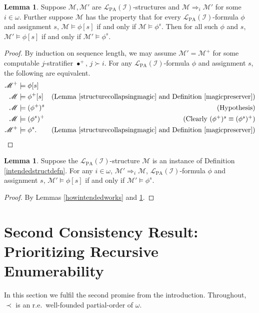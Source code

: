 \documentclass[reqno]{article}
\theoremstyle{definition}
\newtheorem{lemma}[theorem]{Lemma}
\def\L{\mathscr{L}}
\def\M{\mathscr{M}}
\def\LPA{\L_{\mathrm{PA}}}
\def\indset{\mathcal I}
\def\myequiv{\Rightarrow}
\begin{document}
\begin{lemma}
\label{preservedintent}
Suppose $\M,\M'$ are $\LPA(\indset)$-structures
and $\M\myequiv_i\M'$ for some $i\in\omega$.
Further suppose $\M$ has the property that
for every $\LPA(\indset)$-formula $\phi$ and assignment $s$,
$\M\models\phi[s]$ if and only if $\M\models\phi^s$.
Then for all such $\phi$ and $s$,
$\M'\models\phi[s]$ if and only if $\M'\models\phi^s$.
\end{lemma}

\begin{proof}
By induction on sequence length,
we may assume $\M'=\M^+$ for some computable $j$-stratifier $\bullet^+$,
$j\succ i$.
For any $\LPA(\indset)$-formula $\phi$ and assignment $s$,
the following are equivalent.
\begin{align*}
\M^+ &\models \phi[s]\\
\M &\models \phi^+[s]
  &\mbox{(Lemma \ref{structurecollapsingmagic} and Definition \ref{magicpreserver})}\\
\M &\models (\phi^+)^s
  &\mbox{(Hypothesis)}\\
\M &\models (\phi^s)^+
  &\mbox{(Clearly $(\phi^+)^s\equiv(\phi^s)^+$)}\\
\M^+ &\models \phi^s.
  &\mbox{(Lemma \ref{structurecollapsingmagic} and Definition \ref{magicpreserver})}
\end{align*}
\end{proof}

\begin{lemma}
\label{preservedintentspecialcase}
Suppose the $\LPA(\indset)$-structure $\M$ is an instance of Definition \ref{intendedstructdefn}.
For any $i\in\omega$, $\M'\myequiv_i\M$, $\LPA(\indset)$-formula $\phi$ and assignment $s$,
$\M'\models\phi[s]$ if and only if $\M'\models\phi^s$.
\end{lemma}

\begin{proof}
By Lemmas \ref{howintendedworks} and \ref{preservedintent}.
\end{proof}

\section[Second Consistency Result: Prioritizing Recursive Enumerability]{Second Consistency Result:\\Prioritizing Recursive Enumerability}

In this section
we fulfil the second promise from the introduction.
Throughout, $\prec$ is an r.e.~well-founded partial-order of $\omega$.
\end{document}
